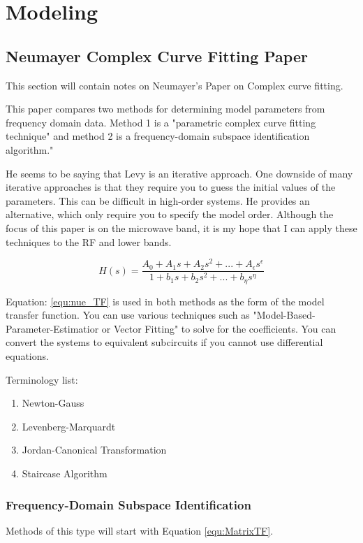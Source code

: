 \section {Modeling}
\subsection{Neumayer Complex Curve Fitting Paper}
This section will contain notes on Neumayer's Paper on Complex curve fitting.\cite{Neu_CompCurve}

This paper compares two methods for determining model parameters from frequency domain data. Method 1 is a "parametric complex curve fitting technique" and method 2 is a frequency-domain subspace identification algorithm."

He seems to be saying that Levy \cite{levy} is an iterative approach. One downside of many iterative approaches is that they require you to guess the initial values of the parameters. This can be difficult in high-order systems. He provides an alternative\cite{van1996continuous}, which only require you to specify the model order. Although the focus of this paper is on the microwave band, it is my hope that I can apply these techniques to the RF and lower bands.

\begin{equation}
\label{equ:nue_TF}
H(s) = \frac{A_0 + A_1 s + A_2 s^2 + ... + A_\epsilon s^\epsilon}{1 + b_1 s + b_2 s^2 + ... + b_\eta s^\eta}
\end{equation}

Equation: \eqref{equ:nue_TF} is used in both methods as the form of the model transfer function. You can use various techniques such as "Model-Based-Parameter-Estimatior or Vector Fitting" to solve for the coefficients. You can convert the systems to equivalent subcircuits if you cannot use differential equations.\cite{neu_ModelSynth}

Terminology list:
\begin{enumerate}
    \item Newton-Gauss
    \item Levenberg-Marquardt
    \item Jordan-Canonical Transformation
    \item Staircase Algorithm
\end{enumerate}

\subsubsection{Frequency-Domain Subspace Identification}
Methods of this type will start with Equation \eqref{equ:MatrixTF}.\cite{van1996continuous}

